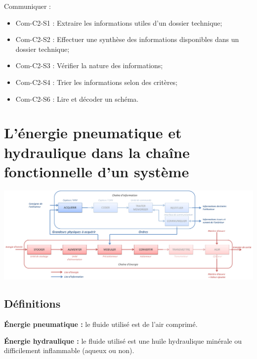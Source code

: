 \documentclass[10pt]{article}
\begin{document}
\begin{savoir}
Communiquer : 
\begin{itemize}
\item Com-C2-S1 : Extraire les informations utiles d’un dossier technique;
\item Com-C2-S2 : Effectuer une synthèse des informations disponibles dans un dossier technique;
\item Com-C2-S3 : Vérifier la nature des informations;
\item Com-C2-S4 : Trier les informations selon des critères;
\item Com-C2-S6 : Lire et décoder un schéma.
\end{itemize}
\end{savoir}


\setlength{\parskip}{0ex plus 0.2ex minus 0ex}
 \renewcommand{\contentsname}{}
 \renewcommand{\baselinestretch}{1}

\tableofcontents

 \renewcommand{\baselinestretch}{1.2}
\setlength{\parskip}{2ex plus 0.5ex minus 0.2ex}



\section{L'énergie pneumatique et hydraulique dans la chaîne fonctionnelle d'un système}

\begin{center}
\includegraphics[width=.95\textwidth]{images/chainefonc}
\end{center}

\subsection{Définitions}
\begin{defi}
\textbf{Énergie pneumatique :} le fluide utilisé est de l’air comprimé.

\textbf{Énergie hydraulique :} le fluide utilisé est une huile hydraulique minérale ou difficilement inflammable (aqueux ou non).
\end{defi}
\end{document}
